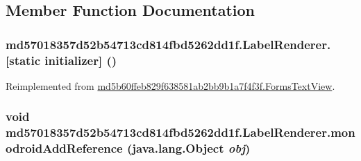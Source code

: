 \subsection{Member Function Documentation}
\hypertarget{classmd57018357d52b54713cd814fbd5262dd1f_1_1_label_renderer_6ab5a62f1e094b7e86c8902176c12c4a}{
\subsubsection[{[static initializer]}]{\setlength{\rightskip}{0pt plus 5cm}md57018357d52b54713cd814fbd5262dd1f.LabelRenderer.\mbox{[}static initializer\mbox{]} ()}}
\label{classmd57018357d52b54713cd814fbd5262dd1f_1_1_label_renderer_6ab5a62f1e094b7e86c8902176c12c4a}




Reimplemented from \hyperlink{classmd5b60ffeb829f638581ab2bb9b1a7f4f3f_1_1_forms_text_view_01f43bb9e6772e31457f7a6ecd45ba1f}{md5b60ffeb829f638581ab2bb9b1a7f4f3f.FormsTextView}.\hypertarget{classmd57018357d52b54713cd814fbd5262dd1f_1_1_label_renderer_565940650659653853e6c97f4efb5f07}{
\subsubsection[{monodroidAddReference}]{\setlength{\rightskip}{0pt plus 5cm}void md57018357d52b54713cd814fbd5262dd1f.LabelRenderer.monodroidAddReference (java.lang.Object {\em obj})}}
\label{classmd57018357d52b54713cd814fbd5262dd1f_1_1_label_renderer_565940650659653853e6c97f4efb5f07}




